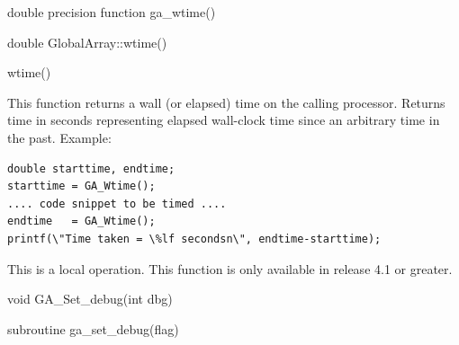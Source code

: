 \documentclass[12pt]{article}
\begin{document}
\begin{fapi}
\begin{fcode}
double precision function ga_wtime()
\end{fcode}
\end{fapi}

\begin{cxxapi}
\begin{cxxcode}
double GlobalArray::wtime()
\end{cxxcode}
\end{cxxapi}

\begin{pyapi}
\begin{pycode}
wtime() 
\end{pycode}
\end{pyapi} 


\begin{desc}

This function returns a wall (or elapsed) time on the calling processor. Returns time in seconds representing elapsed wall-clock time since an arbitrary time in the past. Example:

\begin{verbatim}
double starttime, endtime;
starttime = GA_Wtime();
.... code snippet to be timed ....
endtime   = GA_Wtime();
printf(\"Time taken = \%lf secondsn\", endtime-starttime);
\end{verbatim}

This is a local operation.
This function is only available in release 4.1 or greater.
\end{desc}


\begin{capi}
\begin{ccode}
void GA_Set_debug(int dbg)
\end{ccode}
\begin{funcargs}
\end{funcargs}
\end{capi}

\begin{fapi}
\begin{fcode}
subroutine ga_set_debug(flag)
\end{fcode}
\begin{funcargs}
\end{funcargs}
\end{fapi}
\end{document}
